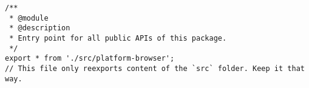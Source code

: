 \begin{verbatim}
/**
 * @module
 * @description
 * Entry point for all public APIs of this package.
 */
export * from './src/platform-browser';
// This file only reexports content of the `src` folder. Keep it that way.
\end{verbatim}
